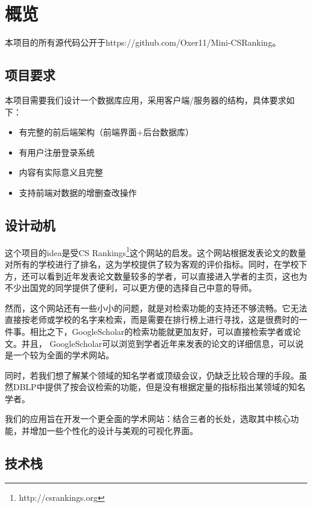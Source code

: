 
\section{概览}

本项目的所有源代码公开于https://github.com/Oxer11/Mini-CSRanking。

\subsection{项目要求}

本项目需要我们设计一个数据库应用，采用客户端/服务器的结构，具体要求如下：
\begin{itemize}
\item 有完整的前后端架构（前端界面+后台数据库）
\item 有用户注册登录系统
\item 内容有实际意义且完整
\item 支持前端对数据的增删查改操作
\end{itemize}

\subsection{设计动机}

这个项目的idea是受CS Rankings\footnote{http://csrankings.org}这个网站的启发。这个网站根据发表论文的数量对所有的学校进行了排名，这为学校提供了较为客观的评价指标。同时，在学校下方，还可以看到近年发表论文数量较多的学者，可以直接进入学者的主页，这也为不少出国党的同学提供了便利，可以更方便的选择自己中意的导师。

然而，这个网站还有一些小小的问题，就是对检索功能的支持还不够流畅。它无法直接按老师或学校的名字来检索，而是需要在排行榜上进行寻找，这是很费时的一件事。相比之下，GoogleScholar的检索功能就更加友好，可以直接检索学者或论文。并且， GoogleScholar可以浏览到学者近年来发表的论文的详细信息，可以说是一个较为全面的学术网站。

同时，若我们想了解某个领域的知名学者或顶级会议，仍缺乏比较合理的手段。虽然DBLP中提供了按会议检索的功能，但是没有根据定量的指标指出某领域的知名学者。

我们的应用旨在开发一个更全面的学术网站：结合三者的长处，选取其中核心功能，并增加一些个性化的设计与美观的可视化界面。

\subsection{技术栈}

